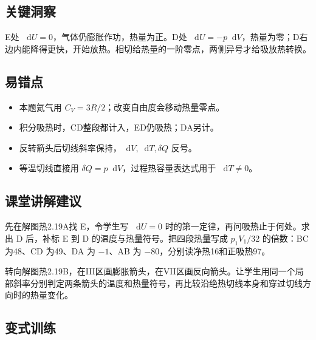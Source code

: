 \documentclass[UTF8,fontset=fandol,a4paper,11pt]{ctexart}
\newcommand{\dd}{\mathop{}\!\mathrm{d}}
\begin{document}
\subsection*{关键洞察}

E处 $\dd U=0$，气体仍膨胀作功，热量为正。D处 $\dd U=-p\dd V$，热量为零；D右边内能降得更快，开始放热。相切给热量的一阶零点，两侧异号才给吸放热转换。



\subsection*{易错点}

\begin{itemize}
\item 本题氦气用 $C_V=3R/2$；改变自由度会移动热量零点。
\item 积分吸热时，CD整段都计入，ED仍吸热；DA另计。
\item 反转箭头后切线斜率保持，$\dd V,\dd T,\delta Q$ 反号。
\item 等温切线直接用 $\delta Q=p\dd V$，过程热容量表达式用于 $\dd T\ne0$。
\end{itemize}



\subsection*{课堂讲解建议}

先在解图热2.19A找 E，令学生写 $\dd U=0$ 时的第一定律，再问吸热止于何处。求出 D 后，补标 E 到 D 的温度与热量符号。把四段热量写成 $p_1V_1/32$ 的倍数：BC 为48、CD 为49、DA 为 $-1$、AB 为 $-80$，分别读净热16和正吸热97。

转向解图热2.19B，在III区画膨胀箭头，在VII区画反向箭头。让学生用同一个局部斜率分别判定两条箭头的温度和热量符号，再比较沿绝热切线本身和穿过切线方向时的热量变化。



\subsection*{变式训练}
\end{document}
